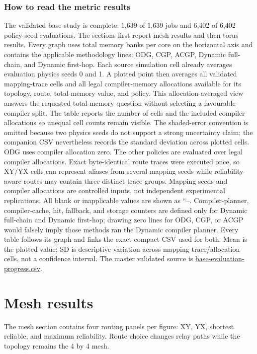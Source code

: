 \documentclass[10pt,a4paper]{article}
\begin{document}
\section*{How to read the metric results}
The validated base study is complete: 1,639 of 1,639 jobs and 6,402 of 6,402 policy-seed evaluations. The sections first report mesh results and then torus results. Every graph uses total memory banks per core on the horizontal axis and contains the applicable methodology lines: ODG, CGP, ACGP, Dynamic full-chain, and Dynamic first-hop.
Each source simulation cell already averages evaluation physics seeds 0 and 1. A plotted point then averages all validated mapping-trace cells and all legal compiler-memory allocations available for its topology, route, total-memory value, and policy. This allocation-averaged view answers the requested total-memory question without selecting a favourable compiler split. The table reports the number of cells and the included compiler allocations so unequal cell counts remain visible. The shaded-error convention is omitted because two physics seeds do not support a strong uncertainty claim; the companion CSV nevertheless records the standard deviation across plotted cells.
ODG uses compiler allocation zero. The other policies are evaluated over legal compiler allocations. Exact byte-identical route traces were executed once, so XY/YX cells can represent aliases from several mapping seeds while reliability-aware routes may contain three distinct trace groups. Mapping seeds and compiler allocations are controlled inputs, not independent experimental replications.
All blank or inapplicable values are shown as ``--. Compiler-planner, compiler-cache, hit, fallback, and storage counters are defined only for Dynamic full-chain and Dynamic first-hop; drawing zero lines for ODG, CGP, or ACGP would falsely imply those methods ran the Dynamic compiler planner.
Every table follows its graph and links the exact compact CSV used for both. Mean is the plotted value; SD is descriptive variation across mapping-trace/allocation cells, not a confidence interval. The master validated source is \href{run:../../../results/qaoa_2seed_2026-10-26/summaries/base-evaluation-progress.csv}{base-evaluation-progress.csv}.
\clearpage
\part*{Mesh results}
The mesh section contains four routing panels per figure: XY, YX, shortest reliable, and maximum reliability. Route choice changes relay paths while the topology remains the 4 by 4 mesh.
\clearpage
\end{document}
